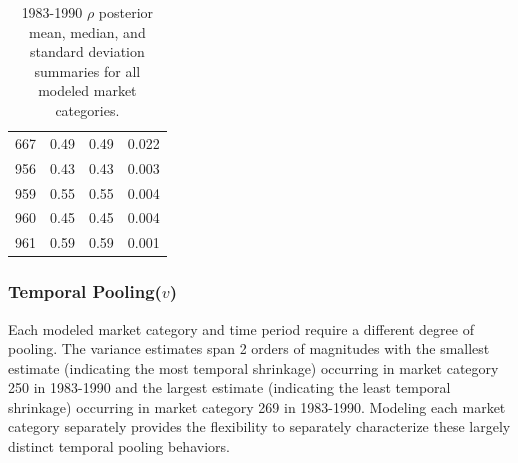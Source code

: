 \documentclass[12pt]{article}
\begin{document}
\begin{table}[h!]
\begin{minipage}[c]{0.45\textwidth}
\begin{tabular}{cccc}
667 & 0.49 & 0.49 & 0.022       \\
956 & 0.43 & 0.43 & 0.003       \\
959 & 0.55 & 0.55 & 0.004       \\
960 & 0.45 & 0.45 & 0.004       \\
961 & 0.59 & 0.59 & 0.001       \\
\hline
\end{tabular}
\caption{1983-1990 $\rho$ posterior mean, median, and standard deviation 
summaries for all modeled market categories.}%
\label{rho83}
\end{minipage} 
\end{table}

%
\clearpage
%

\subsubsection{Temporal Pooling(\(v\))}\label{temporal-pooling-v}

Each modeled market category and time period require a different degree
of pooling. The variance estimates span 2 orders of magnitudes with the
smallest estimate (indicating the most temporal shrinkage) occurring in
market category 250 in 1983-1990 and the largest estimate (indicating
the least temporal shrinkage) occurring in market category 269 in
1983-1990. Modeling each market category separately provides the
flexibility to separately characterize these largely distinct temporal
pooling behaviors.
\end{document}
